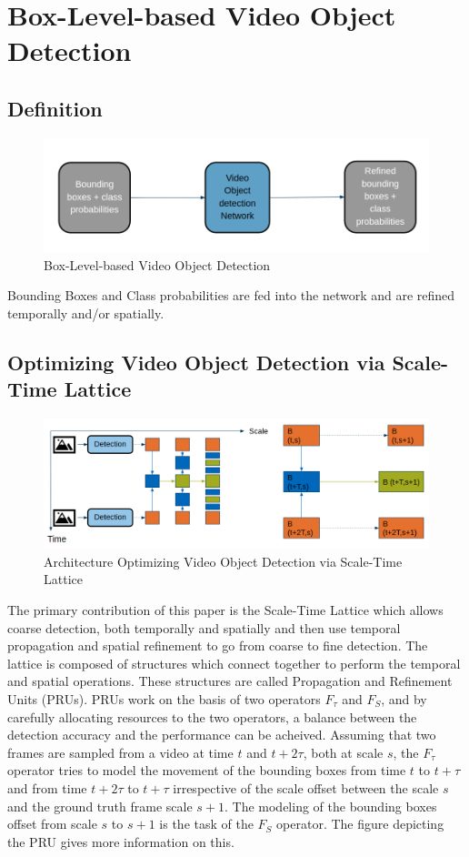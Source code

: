 \documentclass[conference]{IEEEtran}
\begin{document}
\section{Box-Level-based Video Object Detection}

\subsection{Definition}
\begin{figure}[h]
\includegraphics[width=\columnwidth]{box-level-basic}
\caption{Box-Level-based Video Object Detection}
\end{figure}
Bounding Boxes and Class probabilities are fed into the network and are refined temporally and/or spatially.

\subsection{Optimizing Video Object Detection via Scale-Time Lattice}
\begin{figure}[h]
\includegraphics[width=\columnwidth]{scale-time-lattice}
\caption{Architecture Optimizing Video Object Detection via Scale-Time Lattice}
\end{figure}
The primary contribution of this paper is the Scale-Time Lattice which allows coarse detection, both temporally and spatially and then use temporal propagation and spatial refinement to go from coarse to fine detection. The lattice is composed of structures which connect together to perform the temporal and spatial operations. These structures are called Propagation and Refinement Units (PRUs). \newline
PRUs work on the basis of two operators $F_\tau$ and $F_S$, and by carefully allocating resources to the two operators, a balance between the detection accuracy and the performance can be acheived. Assuming that two frames are sampled from a video at time $t$ and $t+2\tau$, both at scale $s$, the $F_\tau$ operator tries to model the movement of the bounding boxes from time $t$ to $t+\tau$ and from time $t+2\tau$ to $t+\tau$ irrespective of the scale offset between the scale $s$ and the ground truth frame scale $s+1$. The modeling of the bounding boxes offset from scale $s$ to $s+1$ is the task of the $F_S$ operator. The figure depicting the PRU gives more information on this. \newline
\end{document}
